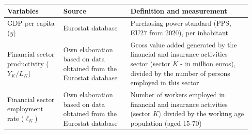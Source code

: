 \documentclass[a4paper,11pt,oneside]{article}
\begin{document}
\begin{table}
\begin{tabular}{lll}
\toprule
Variables & Source    & Definition and measurement             \\
\midrule
\parbox[c]{35mm}{GDP per capita ($y$)}  &  \parbox[c]{35mm}{Eurostat database}   & \parbox[c]{54mm}{Purchasing power standard (PPS, EU27 from 2020), per inhabitant}       \\
\cmidrule(r){2-3}
\parbox[c]{35mm}{Financial sector productivity  ($Y_K/L_K$)} &  \parbox[c]{35mm}{Own elaboration based on data obtained from the Eurostat database} & \parbox[c]{54mm}{Gross value added generated by the financial and insurance activities sector (sector $K$ - in million euros), divided by the number of persons employed in this sector} \\
\cmidrule(r){2-3}
\parbox[c]{35mm}{Financial sector employment rate ($\ell_K$) }    &  \parbox[c]{35mm}{Own elaboration based on data obtained from the Eurostat database} & \parbox[c]{54mm}{Number of workers employed in financial and insurance activities (sector $K$) divided by the working age population (aged 15-70)}   \\
\bottomrule
\end{tabular}%
\end{table}


\pagebreak
\clearpage
\end{document}
